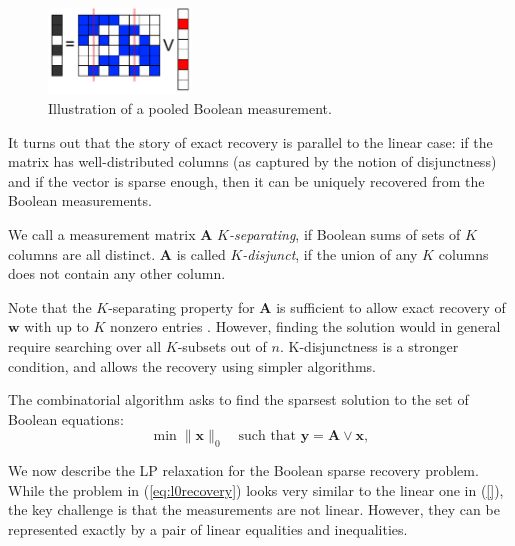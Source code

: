 \begin{figure}[!thb]
\centering
\includegraphics[width=1.5in]{./fig_group_test.pdf}
\caption{  Illustration of a pooled Boolean measurement.}
\label{fig:group_testing}
\end{figure}

It turns out that the story of exact recovery is parallel to the linear case: 
if the matrix has well-distributed columns (as captured by the notion of disjunctness)
and if the vector is sparse enough, then it can be uniquely recovered from the 
Boolean measurements. 

\begin{definition}
We call a measurement matrix $\mathbf{A}$ {\em $K$-separating}, 
if Boolean sums of sets of $K$ columns are all distinct. 
$\mathbf{A}$ is called {\em $K$-disjunct}, if the union of any 
$K$ columns does not contain any other column.
\end{definition}

Note that the $K$-separating property for $\mathbf{A}$ is sufficient 
to allow exact recovery of $\mathbf{w}$ with up to $K$ nonzero entries 
\cite{book2_group_testing}. However, finding the solution would 
in general require searching over all $K$-subsets out of $n$. K-disjunctness
is a stronger condition, and allows the recovery using simpler algorithms. 

The combinatorial algorithm asks to find the sparsest solution to the 
set of Boolean equations:
\begin{equation}
\label{eq:l0recovery}
	\min \|\mathbf{x}\|_0 \quad {\textrm{such that }}\mathbf{y} = \mathbf{A} \lor \mathbf{x},
\end{equation}

We now describe the LP relaxation for the Boolean sparse recovery problem. While
the problem in (\ref{eq:l0recovery}) looks very similar to the linear one in 
(\ref{}), the key challenge is that the measurements are not linear. However, 
they can be represented exactly by a pair of linear equalities and inequalities. 

